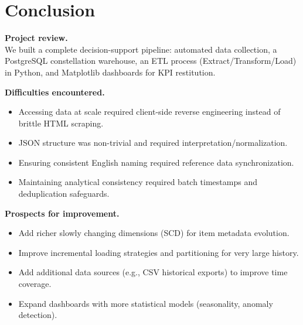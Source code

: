 \chapter{Conclusion}

\begin{conclusionbox}
\textbf{Project review.} \\[0.25em]
We built a complete decision-support pipeline: automated data collection, a PostgreSQL constellation warehouse, an ETL process (Extract/Transform/Load) in Python, and Matplotlib dashboards for KPI restitution.

\medskip
\textbf{Difficulties encountered.}
\begin{itemize}
  \item Accessing data at scale required client-side reverse engineering instead of brittle HTML scraping.
  \item JSON structure was non-trivial and required interpretation/normalization.
  \item Ensuring consistent English naming required reference data synchronization.
  \item Maintaining analytical consistency required batch timestamps and deduplication safeguards.
\end{itemize}

\medskip
\textbf{Prospects for improvement.}
\begin{itemize}
  \item Add richer slowly changing dimensions (SCD) for item metadata evolution.
  \item Improve incremental loading strategies and partitioning for very large history.
  \item Add additional data sources (e.g., CSV historical exports) to improve time coverage.
  \item Expand dashboards with more statistical models (seasonality, anomaly detection).
\end{itemize}
\end{conclusionbox}

